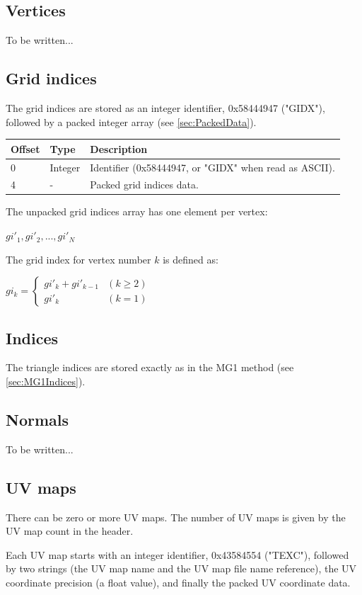 \subsection{Vertices}
To be written...

\subsection{Grid indices}
The grid indices are stored as an integer identifier, 0x58444947 ("GIDX"), followed
by a packed integer array (see \ref{sec:PackedData}).

\begin{tabular}{|l|l|l|}\hline
\textbf{Offset} &  \textbf{Type} & \textbf{Description}\\ \hline
0 & Integer & Identifier (0x58444947, or "GIDX" when read as ASCII).\\ \hline
4 & - & Packed grid indices data.\\ \hline
\end{tabular}

The unpacked grid indices array has one element per vertex:

$gi'_1, gi'_2, ..., gi'_N$

The grid index for vertex number $k$ is defined as:

$gi_k = \begin{cases}
gi'_k + gi'_{k-1} & (k \geq 2)\\
gi'_k & (k = 1)
\end{cases}$

\subsection{Indices}
The triangle indices are stored exactly as in the MG1 method (see \ref{sec:MG1Indices}).

\subsection{Normals}
To be written...

\subsection{UV maps}
There can be zero or more UV maps. The number of UV maps is given by the
UV map count in the header.

Each UV map starts with an integer identifier, 0x43584554 ("TEXC"), followed
by two strings (the UV map name and the UV map file name reference), the
UV coordinate precision (a float value), and finally the packed UV coordinate data.

